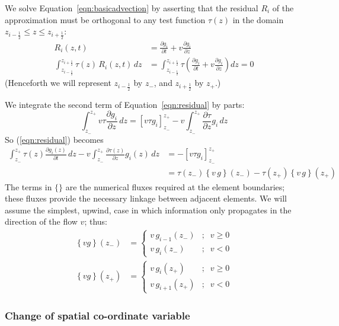 \documentclass[10pt,a4paper]{article}
\newcommand{\dd}{\partial}
\begin{document}
We solve Equation~\ref{eqn:basicadvection} by asserting that the residual $R_i$ of the
approximation must be orthogonal to any test function $\tau(z)$ in the domain
$z_{i-\frac{1}{2}} \leq z \leq z_{i+\frac{1}{2}}$:
\begin{align}
R_i(z,t) & = \frac{\dd g_i}{\dd t} + v \frac{\dd g_i}{\dd z} \nonumber \\
\int_{{z_{i-\frac{1}{2}}}}^{z_{i+\frac{1}{2}}} \tau(z) \, R_i(z,t) \, dz & =
\int_{{z_{i-\frac{1}{2}}}}^{z_{i+\frac{1}{2}}} \tau \left( \frac{\dd g_i}{\dd t} +
  v \frac{\dd g_i}{\dd z} \right) dz = 0
\label{eqn:residual}
\end{align}
(Henceforth we will represent $z_{i-\frac{1}{2}}$ by $z_-$, and
$z_{i+\frac{1}{2}}$ by $z_+$.)

We integrate the second term of Equation~\ref{eqn:residual} by parts:
\[
\int_{z_-}^{z_+} v \tau \frac{\dd g_i}{\dd z} \, dz = \left[ v \tau g_i
\right]_{z_-}^{z_+} - v \int_{z_-}^{z_+} \frac{\dd \tau}{\dd z} g_i \, dz
\]
So (\ref{eqn:residual}) becomes
\begin{align}
\int_{z_-}^{z_+} \tau(z) \frac{\dd g_i(z)}{\dd t} \, dz - v \int_{z_-}^{z_+}
\frac{\dd \tau(z)}{\dd z} g_i(z) \, dz & = -\left[ v \tau g_i
\right]_{z_-}^{z_+}
\label{eqn:intbyparts} \\
& = \tau(z_-)\left\{ v\,g \right\}(z_-) - \tau(z_+)\left\{ v\,g
\right\}(z_+) \nonumber
\end{align}
The terms in $\{\}$ are the numerical fluxes required at the element
boundaries; these fluxes provide the necessary linkage between adjacent
elements. We will assume the simplest, upwind, case in which information only
propagates in the direction of the flow $v$; thus:
\begin{align*}
\left\{ vg \right\}(z_-) & = \left\{
\begin{array}{lc}
v \, g_{i-1}(z_-) & ; \;\; v \geq 0 \\
v \, g_{i}(z_-) & ; \;\; v < 0
\end{array}
\right. \\
\left\{ vg \right\}(z_+) & = \left\{
\begin{array}{lc}
v \, g_{i}(z_+) & ; \;\; v \geq 0 \\
v \, g_{i+1}(z_+) & ; \;\; v < 0
\end{array}
\right.
\end{align*}

\subsubsection{Change of spatial co-ordinate variable}
\label{sec:spatialvarchange}
\end{document}

